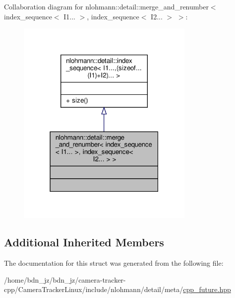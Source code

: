 Collaboration diagram for nlohmann\+:\+:detail\+:\+:merge\+\_\+and\+\_\+renumber$<$ index\+\_\+sequence$<$ I1... $>$, index\+\_\+sequence$<$ I2... $>$ $>$\+:\nopagebreak
\begin{figure}[H]
\begin{center}
\leavevmode
\includegraphics[width=243pt]{structnlohmann_1_1detail_1_1merge__and__renumber_3_01index__sequence_3_01_i1_8_8_8_01_4_00_01ind7f3f7d0d4c10bc1f158de4a327478fcd}
\end{center}
\end{figure}
\subsection*{Additional Inherited Members}


The documentation for this struct was generated from the following file\+:\begin{DoxyCompactItemize}
\item 
/home/bdn\+\_\+jz/bdn\+\_\+jz/camera-\/tracker-\/cpp/\+Camera\+Tracker\+Linux/include/nlohmann/detail/meta/\hyperlink{cpp__future_8hpp}{cpp\+\_\+future.\+hpp}\end{DoxyCompactItemize}
